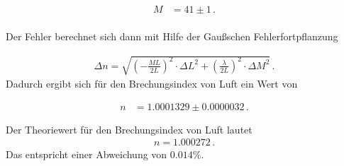 \begin{align*}
  M &= 41 \pm 1 \, .\\
\end{align*}

Der Fehler berechnet sich dann mit Hilfe der Gaußschen Fehlerfortpflanzung

\begin{align*}
  \Delta{n} = \sqrt{\left( -\frac{M L}{2L} \right)^2 \cdot \Delta{L}^2
  + \left(\frac{\lambda}{2 L} \right)^2 \cdot \Delta{M}^2} \, .
\end{align*}
Dadurch ergibt sich für den Brechungsindex von Luft ein Wert von

\begin{align*}
n &= 1.0001329 \pm 0.0000032 \, .
\end{align*}

Der Theoriewert für den Brechungsindex von Luft lautet
\begin{align*}
  n = 1.000272 \, .
\end{align*}
Das entspricht einer Abweichung von $0.014 \%$.
